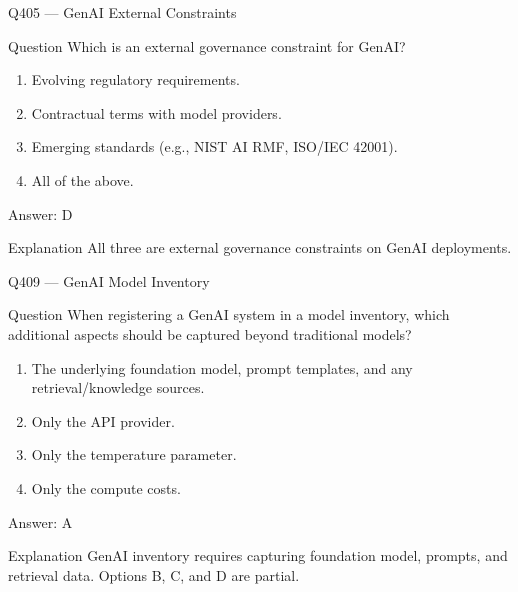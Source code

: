 \documentclass[aspectratio=169,8pt]{beamer}
\begin{document}
	\begin{frame}{Q405 --- GenAI External Constraints}
		\begin{block}{Question}
			Which is an external governance constraint for GenAI?
			\begin{enumerate}
				\item Evolving regulatory requirements.
				\item Contractual terms with model providers.
				\item Emerging standards (e.g., NIST AI RMF, ISO/IEC 42001).
				\item All of the above.
			\end{enumerate}
		\end{block}
		\begin{exampleblock}{Answer: D}\end{exampleblock}
		\begin{block}{Explanation}
			All three are external governance constraints on GenAI deployments.
		\end{block}
	\end{frame}
	



	\begin{frame}{Q409 --- GenAI Model Inventory}
		\begin{block}{Question}
			When registering a GenAI system in a model inventory, which additional aspects should be captured beyond traditional models?
			\begin{enumerate}
				\item The underlying foundation model, prompt templates, and any retrieval/knowledge sources.
				\item Only the API provider.
				\item Only the temperature parameter.
				\item Only the compute costs.
			\end{enumerate}
		\end{block}
		\begin{exampleblock}{Answer: A}\end{exampleblock}
		\begin{block}{Explanation}
			GenAI inventory requires capturing foundation model, prompts, and retrieval data. Options B, C, and D are partial.
		\end{block}
	\end{frame}
	
\end{document}
